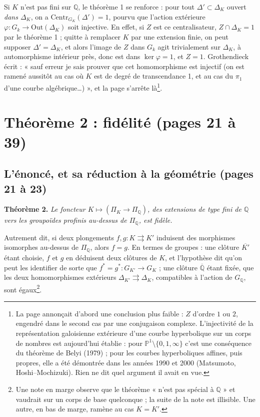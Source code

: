 \documentclass[11pt,a4paper]{article}
\begin{document}
Si $K$ n'est pas fini sur $\mathbb{Q}$, le théorème 1 se renforce : pour
tout $\Delta' \subset \Delta_K$ ouvert \emph{dans $\Delta_K$}, on a
$\mathrm{Centr}_{G_K}(\Delta') = 1$, pourvu que l'action extérieure $\varphi :
G_k \to \mathrm{Out}(\Delta_K)$ soit injective. En effet, si $Z$ est ce
centralisateur, $Z \cap \Delta_K = 1$ par le théorème 1 ; quitte à
remplacer $K$ par une extension finie, on peut supposer $\Delta' = \Delta_K$,
et alors l'image de $Z$ dans $G_k$ agit trivialement sur $\Delta_K$, à
automorphisme intérieur près, donc est dans $\ker \varphi = 1$, et $Z = 1$.
Grothendieck écrit : « sauf erreur je sais prouver que cet homomorphisme est
injectif (on est ramené aussitôt au cas où $K$ est de degré de transcendance
1, et au cas du $\pi_1$ d'une courbe algébrique…) », et la page s'arrête
là\footnote{La page annonçait d'abord une conclusion plus faible : $Z$
d'ordre $1$ ou $2$, engendré dans le second cas par une conjugaison
complexe. L'injectivité de la représentation galoisienne extérieure d'une
courbe hyperbolique sur un corps de nombres est aujourd'hui établie : pour
$\mathbb{P}^1 \setminus \{0, 1, \infty\}$ c'est une conséquence du
théorème de Belyi (1979) ; pour les courbes hyperboliques affines, puis
propres, elle a été démontrée dans les années 1990 et 2000 (Matsumoto,
Hoshi–Mochizuki). Rien ne dit quel argument il avait en vue.}.

\section*{Théorème 2 : fidélité (pages 21 à 39)}

\subsection*{L'énoncé, et sa réduction à la géométrie (pages 21 à 23)}

\textbf{Théorème 2.} \emph{Le foncteur $K \mapsto (\Pi_K \to \Pi_{\mathbb{Q}})$,
des extensions de type fini de $\mathbb{Q}$ vers les groupoïdes profinis
au-dessus de $\Pi_{\mathbb{Q}}$, est fidèle.}

Autrement dit, si deux plongements $f, g : K \rightrightarrows K'$ induisent
des morphismes isomorphes au-dessus de $\Pi_{\mathbb{Q}}$, alors $f = g$. En
termes de groupes : une clôture $\overline{K'}$ étant choisie, $f$ et $g$ en
déduisent deux clôtures de $K$, et l'hypothèse dit qu'on peut les identifier
de sorte que $f^{*} = g^{*} : G_{K'} \to G_K$ ; une clôture
$\overline{\mathbb{Q}}$ étant fixée, que les deux homomorphismes extérieurs
$\Delta_{K'} \rightrightarrows \Delta_K$, compatibles à l'action de
$G_{\mathbb{Q}}$, sont égaux\footnote{Une note en marge observe que le
théorème « n'est pas spécial à $\mathbb{Q}$ » et vaudrait sur un corps de
base quelconque ; la suite de la note est illisible. Une autre, en bas de
marge, ramène au cas $K = K'$.}.
\end{document}
